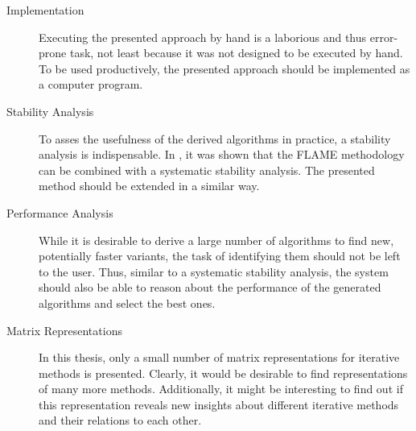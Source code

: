 \begin{description}
\item[Implementation] Executing the presented approach by hand is a laborious and thus error-prone task, not least because it was not designed to be executed by hand. To be used productively, the presented approach should be implemented as a computer program.

\item[Stability Analysis] To asses the usefulness of the derived algorithms in practice, a stability analysis is indispensable. In \cite{Bientinesi:thesis}, it was shown that the FLAME methodology can be combined with a systematic stability analysis. The presented method should be extended in a similar way.

\item[Performance Analysis] While it is desirable to derive a large number of algorithms to find new, potentially faster variants, the task of identifying them should not be left to the user. Thus, similar to a systematic stability analysis, the system should also be able to reason about the performance of the generated algorithms and select the best ones.

\item[Matrix Representations] In this thesis, only a small number of matrix representations for iterative methods is presented. Clearly, it would be desirable to find representations of many more methods. Additionally, it might be interesting to find out if this representation reveals new insights about different iterative methods and their relations to each other.
\end{description}
